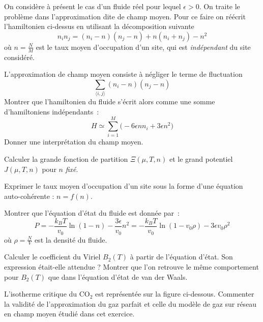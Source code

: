 \documentclass[utf8, 11pt]{feuille}
\begin{document}
On considère à présent le cas d'un fluide réel pour lequel $\epsilon>0$. On traite le problème dans l'approximation dite de champ moyen. Pour ce faire on réécrit l'hamiltonien ci-dessus en utilisant la décomposition suivante
$$
n_i n_j = (n_i -n)(n_j -n)+ n(n_i+n_j)-n^2
$$
où $n=\frac{N}{M}$ est le taux moyen d'occupation d'un site, qui est {\it indépendant} du site considéré.

\question
L'approximation de champ moyen consiste à négliger le terme de fluctuation
$$
\sum_{\langle i,j\rangle} (n_i -n)(n_j -n)
$$
Montrer que l'hamiltonien du fluide s'écrit alors comme une somme d'hamiltoniens indépendants~:
$$
H \simeq \sum_{i=1}^{M}\bigg(-6\epsilon n n_i+ 3\epsilon n^2 \bigg)
$$
Donner une interprétation du \og champ moyen\fg.

\question
Calculer la grande fonction de partition $\Xi(\mu,T,n)$ et le grand potentiel $J(\mu,T,n)$ pour $n$ {\it fixé}.

\question
Exprimer le taux moyen d'occupation d'un site sous la forme d'une équation auto-cohérente : $n=f(n)$.

\question
Montrer que l'équation d'état du fluide est donnée par~:
$$
P=-\frac{k_BT}{v_0} \ln(1-n) -\frac{3\epsilon} {v_0}n^2 =-\frac{k_BT}{v_0} \ln(1-v_0\rho) -3\epsilon v_0 \rho^2
$$
où $\rho=\frac{N}{V}$ est la densité du fluide. 

\question
Calculer le coefficient du Viriel $B_2(T)$ à partir de l'équation d'état. Son expression était-elle attendue ? Montrer que l'on retrouve le même comportement pour $B_2(T)$ que dans l'équation d'état de van der Waals.

\question
L'isotherme critique du CO$_2$ est représentée sur la figure ci-dessous. Commenter la validité de l'approximation du gaz parfait et celle du modèle de gaz sur réseau en champ moyen étudié dans cet exercice.
\end{document}

